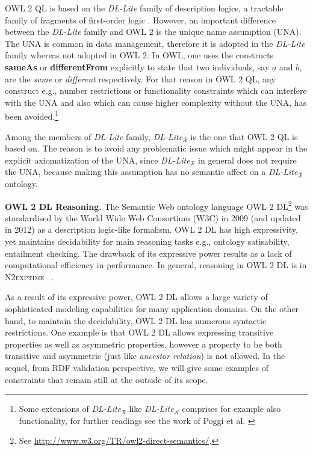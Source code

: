 \documentclass{llncs}
\begin{document}
OWL 2 QL is based on the \textit{DL-Lite} family of description logics, a tractable family of fragments of first-order logic \cite{Artale2009,Calvanese2007}. 
However, an important difference between the \textit{DL-Lite} family and OWL 2 is the
unique name assumption (UNA). The UNA is common in data management, therefore it is adopted in the \textit{DL-Lite} family whereas not adopted in OWL 2. In OWL, one uses the constructs \textbf{sameAs} or \textbf{differentFrom} explicitly to state that two individuals, say  $a$ and $b$, are the \emph{same} or \emph{different} respectively. For that reason in OWL 2 QL, any construct e.g., number restrictions or functionality constraints which can interfere with the UNA and also which can cause higher complexity without the UNA, has been avoided.\footnote{Some extensions of \textit{DL-Lite}$_\mathcal{R}$ like \textit{DL-Lite}$_\mathcal{A}$ comprises for example also functionality, for further readings see the work of Poggi et al. \cite{poggi2008linking}}

Among the members of \textit{DL-Lite} family, \textit{DL-Lite}$_\mathcal{R}$ is the one that OWL 2 QL is based on. The reason is to avoid any problematic issue which might appear in the explicit axiomatization of the UNA, since  \textit{DL-Lite}$_\mathcal{R}$ in general does not require the UNA, because making this assumption has no semantic affect on a \textit{DL-Lite}$_\mathcal{R}$ ontology.

\textbf{OWL 2 DL Reasoning.}
The Semantic Web ontology language OWL 2 DL\footnote{See \url{http://www.w3.org/TR/owl2-direct-semantics/}.} was standardised by
the World Wide Web Consortium (W3C) in 2009 (and updated in 2012) as a
description logic-like formalism.  OWL 2 DL has high expressivity, yet maintains  decidability for main reasoning tasks e.g., ontology satisability, 
entailment checking. The drawback of its expressive power results as a lack of computational efficiency in performance. In general, reasoning in OWL 2 DL is in \textsc{N2exptime}~ \cite{owl2profiles2008}. 

As a result of its expressive power, OWL 2 DL allows a large variety of sophisticated modeling capabilities for many application domains.  On the other hand, to maintain the decidability, OWL 2 DL has numerous syntactic restrictions. One example is that OWL 2 DL allows  expressing transitive properties as well as asymmetric properties, however a property to be both transitive and asymmetric (just like \emph{ancestor relation}) is not allowed. In the sequel, from RDF validation perspective, we will give some examples of constraints that remain still at the outside of its scope. 
\end{document}
